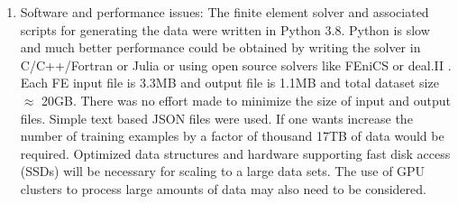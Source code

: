 \documentclass[12pt]{article}
\begin{document}
\begin{enumerate}
\item{Software and performance issues: The finite element solver and associated scripts for generating the data were written in Python 3.8. Python is slow and much better performance could be obtained by writing the solver in C/C++/Fortran or Julia or using open source solvers like FEniCS \cite{paper:fenics} or deal.II \cite{misc:deal.ii}. Each FE input file is 3.3MB and output file is 1.1MB and total dataset size $\approx$  20GB. There was no effort made to minimize the size of input and output files. Simple text based JSON files were used. If one wants increase the number of training examples by a factor of thousand 17TB of data would be required. Optimized data structures and hardware supporting fast disk access (SSDs) will be necessary for scaling to a large data sets. The use of GPU clusters to process large amounts of data may also need to be considered. }
\end{enumerate}
{}

\end{document}
